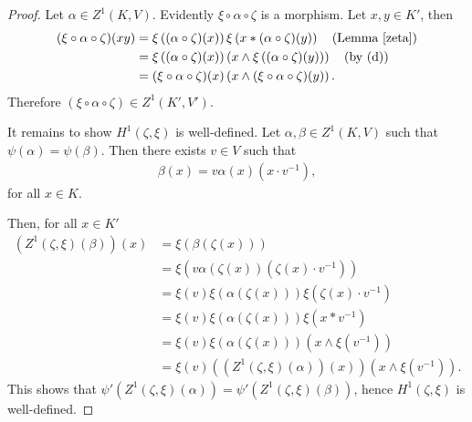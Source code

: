 \begin{proof}
	Let $\alpha \in Z^1(K, V)$. Evidently $\xi \circ \alpha \circ \zeta$ is a morphism. Let $x,y \in K'$, then
	\begin{align*}
		(\xi \circ \alpha \circ \zeta)(xy) &= \xi \left((\alpha \circ \zeta)(x)\right) \xi \left(x \ast (\alpha \circ \zeta)(y)\right) \quad\textrm{(Lemma \ref{zeta})} \\
			&= \xi \left((\alpha \circ \zeta)(x)\right) \left(x \wedge \xi\left((\alpha \circ \zeta)(y)\right)\right) \quad\textrm{(by (d))} \\
			&= (\xi \circ \alpha \circ \zeta)(x) \left(x \wedge (\xi \circ \alpha \circ \zeta)(y)\right).
	\end{align*}
	Therefore $(\xi \circ \alpha \circ \zeta) \in Z^1(K', V')$.

	It remains to show $H^1(\zeta, \xi)$ is well-defined. Let $\alpha,\beta \in Z^1(K, V)$ such that $\psi(\alpha) = \psi(\beta)$. Then there exists $v \in V$ such that
	\begin{align*}
		\beta(x) = v\alpha(x)(x \cdot v^{-1}),
	\end{align*}
	for all $x \in K$.

	Then, for all $x \in K'$
	\begin{align*}
		\left(Z^1(\zeta, \xi)(\beta)\right)(x) &= \xi\left(\beta(\zeta(x))\right) \\
			&= \xi \left( v \alpha(\zeta(x))\left(\zeta(x) \cdot v^{-1}\right) \right) \\
			&= \xi(v) \xi(\alpha(\zeta(x))) \xi\left( \zeta(x) \cdot v^{-1}\right) \\
			&= \xi(v) \xi(\alpha(\zeta(x))) \xi\left( x \ast v^{-1}\right) \\
			&= \xi(v) \xi(\alpha(\zeta(x)))\left(x \wedge \xi(v^{-1})\right) \\
			&= \xi(v) \left(\left(Z^1(\zeta, \xi)(\alpha)\right)(x)\right) \left(x \wedge \xi(v^{-1})\right).
	\end{align*}
	This shows that $\psi'\left(Z^1(\zeta, \xi)(\alpha)\right) = \psi'\left(Z^1(\zeta, \xi)(\beta)\right)$, hence $H^1(\zeta, \xi)$ is well-defined.
\end{proof} 

